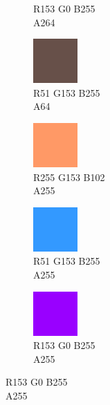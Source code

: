 \begin{figure}[!h]
\begin{subfigure}{0.105\textwidth}
		\vspace*{-20px} \caption*{\hspace*{-0.25px}\tiny R153 G0 B255 \\ \tiny A264}
	\end{subfigure}
	\begin{subfigure}{0.105\textwidth}\centering
		\includegraphics[scale=1, frame]{gui-imgs/R255G153B102A64}
		\vspace*{-20px} \caption*{\hspace*{-0.25px}\tiny R51 G153 B255 \\ \tiny A64}
	\end{subfigure}
	\begin{subfigure}{0.105\textwidth}\centering
		\includegraphics[scale=1, frame]{gui-imgs/R255G153B102A255}
		\vspace*{-20px} \caption*{\hspace*{-0.25px}\tiny R255 G153 B102 \\ \tiny A255}
	\end{subfigure}
 	\begin{subfigure}{0.105\textwidth}\centering
		\includegraphics[scale=1, frame]{gui-imgs/R51G153B255A255}
		\vspace*{-20px} \caption*{\hspace*{-0.25px}\tiny R51 G153 B255 \\ \tiny A255}
	\end{subfigure}
	\begin{subfigure}{0.105\textwidth}\centering
		\includegraphics[scale=1, frame]{gui-imgs/R153G0B255A255}
		\vspace*{-20px} \caption*{\hspace*{-0.25px}\tiny R153 G0 B255 \\ \tiny A255}

\end{subfigure}
\end{figure}

